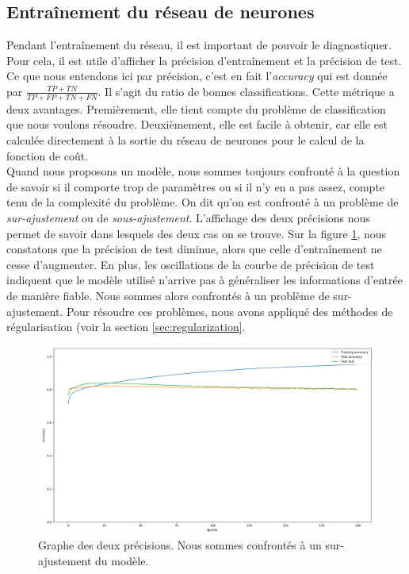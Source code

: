 \documentclass[a4paper,11pt]{article}
\begin{document}
\subsection{Entraînement du réseau de neurones}
    
    Pendant l'entraînement du réseau, il est important de pouvoir le diagnostiquer.
    Pour cela, il est utile d'afficher la précision d'entraînement et la précision de test.
    Ce que nous entendons ici par précision, c'est en fait l'\textit{accuracy} qui est donnée par $\frac{TP+TN}{TP+FP+TN+FN}$.
    Il s'agit du ratio de bonnes classifications.
    Cette métrique a deux avantages. 
    Premièrement, elle tient compte du problème de classification que nous voulons résoudre.
    Deuxièmement, elle est facile à obtenir, car elle est calculée directement à la sortie du réseau de neurones pour le calcul de la fonction de coût.
    \\
    Quand nous proposons un modèle, nous sommes toujours confronté à la question de savoir si il comporte trop de paramètres ou si il n'y en a pas assez, compte tenu de la complexité du problème.
    On dit qu'on est confronté à un problème de \textit{sur-ajustement} ou de \textit{sous-ajustement}.
    L'affichage des deux précisions nous permet de savoir dans lesquels des deux cas on se trouve.
    Sur la figure \ref{fig:overfitting_1}, nous constatons que la précision de test diminue, alors que celle d'entraînement ne cesse d'augmenter.
    En plus, les oscillations de la courbe de précision de test indiquent que le modèle utilisé n'arrive pas à généraliser les informations d'entrée de manière fiable.
    Nous sommes alors confrontés à un problème de sur-ajustement.
    Pour résoudre ces problèmes, nous avons appliqué des méthodes de régularisation (voir la section \ref{sec:regularization}.

	\begin{figure}[H]
	    \centering
	    \includegraphics[scale=0.3]{overfitting_1.png}
	    \caption{Graphe des deux précisions. Nous sommes confrontés à un sur-ajustement du modèle.}
	    \label{fig:overfitting_1}
	\end{figure}
\end{document}
